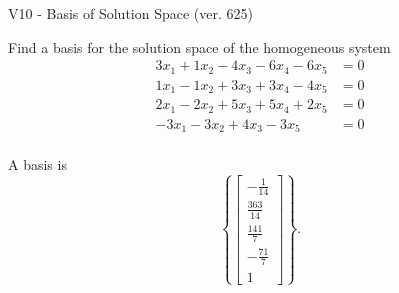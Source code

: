 \begin{exercise}
  \begin{exerciseTitle}V10 - Basis of Solution Space (ver. 625)\end{exerciseTitle}
  \begin{exerciseStatement}
    Find a basis for the solution space of the homogeneous system 
\begin{align*}
 3 x_ 1 + 1 x_ 2 -4 x_ 3 -6 x_ 4 -6 x_ 5 &= 0  \\ 
  1 x_ 1 -1 x_ 2 + 3 x_ 3 + 3 x_ 4 -4 x_ 5 &= 0  \\ 
  2 x_ 1 -2 x_ 2 + 5 x_ 3 + 5 x_ 4 + 2 x_ 5 &= 0  \\ 
  -3 x_ 1 -3 x_ 2 + 4 x_ 3 -3 x_ 5 &= 0  \\ 
 \end{align*}


 
  \end{exerciseStatement}

  \begin{exerciseAnswer}
   A basis is   
\[\left\{\left[\begin{array}{c}
-\frac{1}{14} \\
\frac{363}{14} \\
\frac{141}{7} \\
-\frac{71}{7} \\
1
\end{array}\right]\right\}.\]

  


  \end{exerciseAnswer}
\end{exercise}